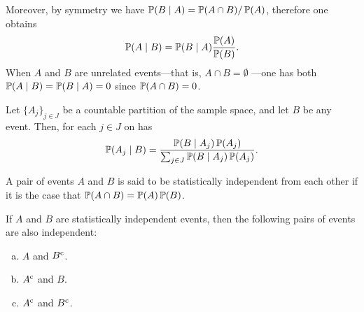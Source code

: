 Moreover, by symmetry we have \(\operatorname{\mathbb{P}}(B \mid A) = \operatorname{\mathbb{P}}(A \cap B)/\operatorname{\mathbb{P}}(A)\),
therefore one obtains
\[
    \operatorname{\mathbb{P}}(A \mid B) = \operatorname{\mathbb{P}}(B \mid A) \frac{\operatorname{\mathbb{P}}(A)}{\operatorname{\mathbb{P}}(B)}.
\]
When \(A\) and \(B\) are unrelated events---that is, \(A \cap B = \emptyset\)
---one has both \(\operatorname{\mathbb{P}}(A \mid B) = \operatorname{\mathbb{P}}(B \mid A) = 0\) since
\(\operatorname{\mathbb{P}}(A \cap B) = 0\).

\begin{theorem}
    \label{thm:bayes-rule}
    Let \(\{A_{j}\}_{j \in J}\) be a countable partition of the sample space, and
    let \(B\) be any event. Then, for each \(j \in J\) on has
    \[
        \operatorname{\mathbb{P}}(A_j \mid B) =
        \frac{\operatorname{\mathbb{P}}(B \mid A_j) \operatorname{\mathbb{P}}(A_j)}{\sum_{j \in J} \operatorname{\mathbb{P}}(B \mid A_j) \operatorname{\mathbb{P}}(A_j)}.
    \]
\end{theorem}

\begin{definition}
    \label{def:statistically-independent}
    A pair of events \(A\) and \(B\) is said to be statistically independent from
    each other if it is the case that \(\operatorname{\mathbb{P}}(A \cap B) = \operatorname{\mathbb{P}}(A) \operatorname{\mathbb{P}}(B)\).
\end{definition}

\begin{theorem}
    \label{thm:statistically-independent-pairs}
    If \(A\) and \(B\) are statistically independent events, then the following
    pairs of events are also independent:
    \begin{enumerate}[(a)]\setlength\itemsep{0em}
        \item \(A\) and \({B}^{\text{c}}\).
        \item \({A}^{\text{c}}\) and \(B\).
        \item \({A}^{\text{c}}\) and \({B}^{\text{c}}\).
    \end{enumerate}
\end{theorem}

